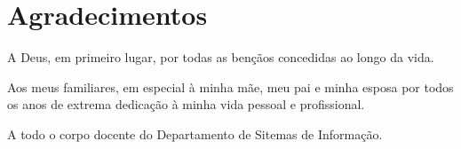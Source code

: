 \chapter*{Agradecimentos}
\label{CHP:ACKNOWLEDGMENT}%
\thispagestyle{empty}

\noindent A Deus, em primeiro lugar, por todas as ben\c{c}\~{a}os concedidas ao longo da vida.

\vspace{0.3cm}


\noindent Aos meus familiares, em especial {\`a} minha mãe, meu pai e minha esposa por todos os anos de extrema dedica\c{c}\~{a}o \`{a} minha vida pessoal e profissional.



\vspace{0.3cm}

\noindent A todo o corpo docente do Departamento de Sitemas de Informação.
